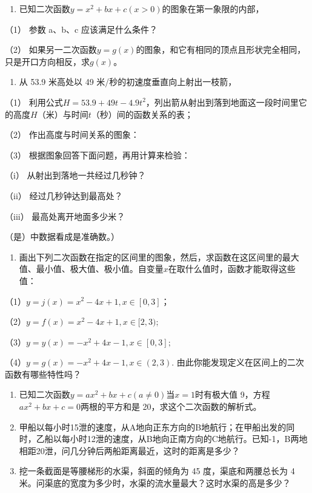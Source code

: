 \begin{enumerate}[start=5]
\item
  已知二次函数\(y = x^2 + bx + c (x > 0)\)的图象在第一象限的内部，
\end{enumerate}

（1） 参数 a、b、c 应该满足什么条件？

（2）
如果另一二次函数\(y = g(x)\)的图象，和它有相同的顶点且形状完全相同，只是开口方向相反，求\(g(x)\)。

\begin{enumerate}[start=6]
\item
  从 53.9 米高处以 49 米/秒的初速度垂直向上射出一枝箭，
\end{enumerate}

（1）
利用公式\(H = 53.9 + 49t - 4.9t^2\)，列出箭从射出到落到地面这一段时间里它的高度\(H\)（米）与时间\(t\)（秒）间的函数关系的表；

（2） 作出高度与时间关系的图象：

（3） 根据图象回答下面问题，再用计算来检验：

（i） 从射出到落地一共经过几秒钟？

（ii） 经过几秒钟达到最高处？

（iii） 最高处离开地面多少米？

（是）中数据看成是准确数。）

\begin{enumerate}[start=7]
\item
  画出下列二次函数在指定的区间里的图象，然后，求函数在这区间里的最大值、最小值、极大值、极小值。自变量\(x\)在取什么值时，函数才能取得这些值：
\end{enumerate}

（1）\(y = j(x) = x^2 - 4x + 1, x \in [0, 3]\)；

（2）\(y = f(x) = x^2 - 4x + 1, x \in [2, 3);\)

（3）\(y = y(x) = -x^2 + 4x - 1, x \in [0, 3];\)

（4）\(y = g(x) = -x^2 + 4x - 1, x \in (2, 3).\)
由此你能发现定义在区间上的二次函数有哪些特性吗？

\begin{enumerate}[start=8]
\item
  已知二次函数\(y = ax^2 + bx + c (a \neq 0)\)当\(x = 1\)时有极大值
  9，方程\(ax^2 + bx + c = 0\)两根的平方和是
  20，求这个二次函数的解析式。
\item
  甲船以每小时15泄的速度，从A地向正东方向的B地航行；在甲船出发的同时，乙船以每小时12泄的速度，从B地向正南方向的C地航行。已知-1，B两地相距20泄，问几分钟后两船距离最近，这时的距离是多少？
\item
  挖一条截面是等腰梯形的水渠，斜面的倾角为 45 度，渠底和两腰总长为 4
  米。问渠底的宽度为多少时，水渠的流水量最大？这时水渠的高是多少？
\end{enumerate}


